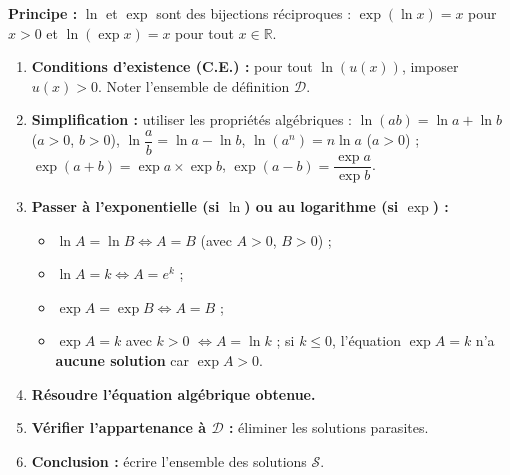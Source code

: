 \documentclass[11pt]{article}
\begin{document}
\begin{methode}
\textbf{Principe :} $\ln$ et $\exp$ sont des bijections réciproques : $\exp(\ln x)=x$ pour $x>0$ et $\ln(\exp x)=x$ pour tout $x\in\mathbb{R}$.
\begin{enumerate}
    \item \textbf{Conditions d'existence (C.E.) :} pour tout $\ln(u(x))$, imposer $u(x) > 0$. Noter l'ensemble de définition $\mathcal{D}$.
    \item \textbf{Simplification :} utiliser les propriétés algébriques :
    $\ln(ab)=\ln a+\ln b$ ($a>0$, $b>0$), $\ln\dfrac{a}{b}=\ln a-\ln b$, $\ln(a^n)=n\ln a$ ($a>0$) ;
    $\exp(a+b)=\exp a \times \exp b$, $\exp(a-b)=\dfrac{\exp a}{\exp b}$.
    \item \textbf{Passer à l'exponentielle (si $\ln$) ou au logarithme (si $\exp$) :}
    \begin{itemize}
        \item $\ln A = \ln B \iff A=B$ (avec $A>0$, $B>0$) ;
        \item $\ln A = k \iff A = e^k$ ;
        \item $\exp A = \exp B \iff A=B$ ;
        \item $\exp A = k$ avec $k>0$ $\iff A = \ln k$ ; si $k\le 0$, l'équation $\exp A = k$ n'a \textbf{aucune solution} car $\exp A > 0$.
    \end{itemize}
    \item \textbf{Résoudre l'équation algébrique obtenue.}
    \item \textbf{Vérifier l'appartenance à $\mathcal{D}$ :} éliminer les solutions parasites.
    \item \textbf{Conclusion :} écrire l'ensemble des solutions $\mathcal{S}$.
\end{enumerate}
\end{methode}
\end{document}
